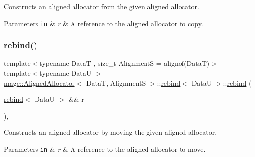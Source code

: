 Constructs an aligned allocator from the given aligned allocator. 
\begin{DoxyParams}[1]{Parameters}
\mbox{\tt in}  & {\em r} & A reference to the aligned allocator to copy. \\
\hline
\end{DoxyParams}
\hypertarget{structmage_1_1_aligned_allocator_1_1rebind_a863c98bf6c924e65e9d972ce93fccefc}{}\label{structmage_1_1_aligned_allocator_1_1rebind_a863c98bf6c924e65e9d972ce93fccefc} 
\subsubsection{\texorpdfstring{rebind()}{rebind()}\hspace{0.1cm}{\footnotesize\ttfamily [3/3]}}
{\footnotesize\ttfamily template$<$typename DataT , size\+\_\+t AlignmentS = alignof(\+Data\+T)$>$ \\
template$<$typename DataU $>$ \\
\hyperlink{classmage_1_1_aligned_allocator}{mage\+::\+Aligned\+Allocator}$<$ DataT, AlignmentS $>$\+::\hyperlink{structmage_1_1_aligned_allocator_1_1rebind}{rebind}$<$ DataU $>$\+::\hyperlink{structmage_1_1_aligned_allocator_1_1rebind}{rebind} (\begin{DoxyParamCaption}\item[{\hyperlink{structmage_1_1_aligned_allocator_1_1rebind}{rebind}$<$ DataU $>$ \&\&}]{r }\end{DoxyParamCaption})\hspace{0.3cm}{\ttfamily [private]}, {\ttfamily [delete]}}

Constructs an aligned allocator by moving the given aligned allocator. 
\begin{DoxyParams}[1]{Parameters}
\mbox{\tt in}  & {\em r} & A reference to the aligned allocator to move. \\
\hline
\end{DoxyParams}
\hypertarget{structmage_1_1_aligned_allocator_1_1rebind_a6d49df31fc4f0a5122267be6ab8888a7}{}\label{structmage_1_1_aligned_allocator_1_1rebind_a6d49df31fc4f0a5122267be6ab8888a7} 
